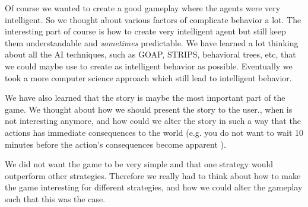 \documentclass[11pt,a4paper]{article}
\begin{document}
Of course we wanted to create a good gameplay where the agents were very intelligent. So we thought about various factors of complicate behavior a lot. The interesting part of course is how to create very intelligent agent but still keep them understandable and \textit{sometimes} predictable. We have learned a lot thinking about all the AI techniques, such as GOAP, STRIPS, behavioral trees, etc, that we could maybe use to create as intelligent behavior as possible. Eventually we took a more computer science approach which still lead to intelligent behavior.

We have also learned that the story is maybe the most important part of the game. We thought about how we should present the story to the user., when is not interesting anymore, and how could we alter the story in such a way that the actions has immediate consequences to the world (e.g. you do not want to wait 10 minutes before the action's consequences become apparent ).

We did not want the game to be very simple and that one strategy would outperform other strategies. Therefore we really had to think about how to make the game interesting for different strategies, and how we could alter the gameplay such that this was the case. 
%
\end{document}
